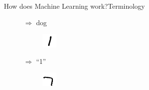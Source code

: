 \documentclass{beamer}
\begin{document}
\begin{frame}{How does Machine Learning work?}{Terminology}
\begin{itemize}
\begin{figure}[H]
\begin{subfigure}{.1\textwidth}
		\end{subfigure} $\Rightarrow$ dog
	\end{figure}
	\begin{figure}[H]
		\begin{subfigure}{.1\textwidth}
			\includegraphics[width=\textwidth]{MNIST_cl_1_0} 
		\end{subfigure} $\Rightarrow$ ``1''
		\begin{subfigure}{.1\textwidth}
			\includegraphics[width=\textwidth]{MNIST_cl_7_0}

\end{subfigure}
\end{figure}
\end{itemize}
\end{frame}
\end{document}
